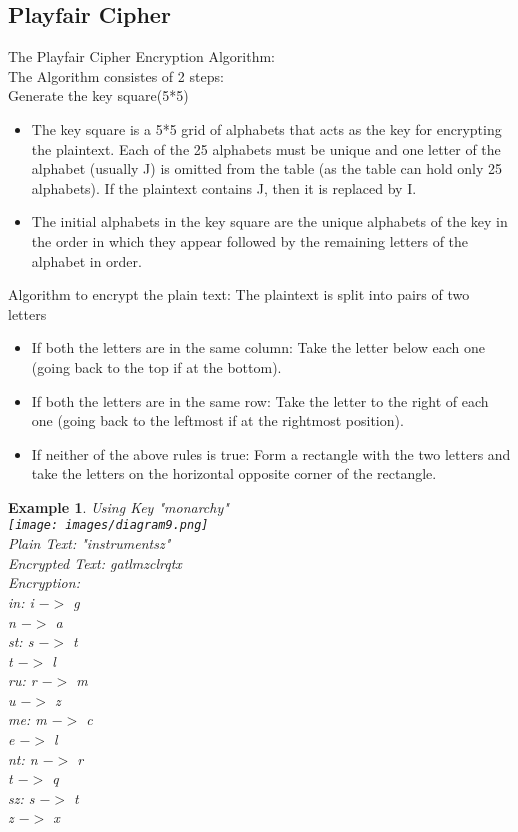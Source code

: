 \documentclass{article}
\newtheorem{ex}{Example}[section]
\begin{document}
\subsection{Playfair Cipher}
The Playfair Cipher Encryption Algorithm:\\
The Algorithm consistes of 2 steps:\\
Generate the key square(5*5) 
\begin{itemize}
        \item The key square is a 5*5 grid of alphabets that acts as the key for encrypting the plaintext. Each of the 25 alphabets must be unique and one letter of the alphabet (usually J) is omitted from the table (as the table can hold only 25 alphabets). If the plaintext contains J, then it is replaced by I.
        \item The initial alphabets in the key square are the unique alphabets of the key in the order in which they appear followed by the remaining letters of the alphabet in order.
\end{itemize}
Algorithm to encrypt the plain text: The plaintext is split into pairs of two letters \begin{itemize}
    \item If both the letters are in the same column: Take the letter below each one (going back to the top if at the bottom).
    \item If both the letters are in the same row: Take the letter to the right of each one (going back to the leftmost if at the rightmost position). 
    \item If neither of the above rules is true: Form a rectangle with the two letters and take the letters on the horizontal opposite corner of the rectangle. 
\end{itemize}
\begin{ex}
Using Key "monarchy" \\
\texttt{[image: images/diagram9.png]}
\\ Plain Text: "instrumentsz"\\
Encrypted Text: gatlmzclrqtx\\
Encryption: \\in:
  i $ ->$ g\\
  n $ ->$ a\\st:
  s $ ->$ t\\
  t $ ->$ l\\ru:
  r $ ->$ m\\
  u $ ->$ z\\me:
  m $ ->$ c\\
  e $ ->$ l\\nt:
  n $ ->$ r\\
  t $ ->$ q\\sz:
  s $ ->$ t\\
  z $ ->$ x\\
\end{ex}
\end{document}
